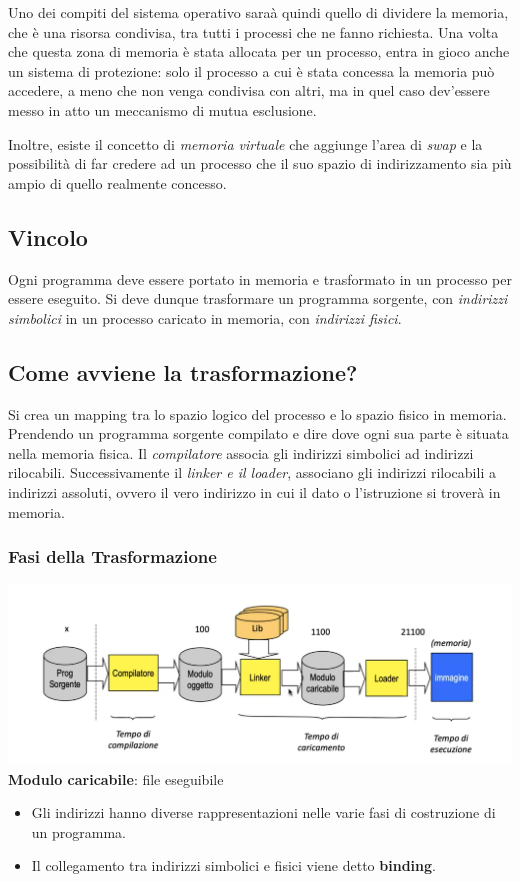 \documentclass[a4paper,12pt, twoside]{report}
\begin{document}
Uno dei compiti del sistema operativo sara\`a quindi quello di dividere la memoria, che \`e una risorsa condivisa, tra tutti i processi che ne fanno richiesta. Una volta che questa zona di memoria \`e stata allocata per un processo, entra in gioco anche un sistema di protezione: solo il processo a cui \`e stata concessa la memoria pu\`o accedere, a meno che non venga condivisa con altri, ma in quel caso dev'essere messo in atto un meccanismo di mutua esclusione.

Inoltre, esiste il concetto di \emph{memoria virtuale} che aggiunge l'area di \emph{swap} e la possibilit\`a di far credere ad un processo che il suo spazio di indirizzamento sia pi\`u ampio di quello realmente concesso.

\subsection{Vincolo}
Ogni programma deve essere portato in memoria e trasformato in un processo per essere eseguito.
Si deve dunque trasformare un programma sorgente, con \emph{indirizzi simbolici} in un processo caricato in memoria, con \emph{indirizzi fisici}. 

\subsection{Come avviene la trasformazione?}

Si crea un mapping tra lo spazio logico del processo e lo spazio fisico in memoria. Prendendo un programma sorgente compilato e dire dove ogni sua parte \`e situata nella memoria fisica. Il \emph{compilatore} associa gli indirizzi simbolici ad indirizzi rilocabili. Successivamente il \emph{linker e il loader}, associano gli indirizzi rilocabili a indirizzi assoluti, ovvero il vero indirizzo in cui il dato o l'istruzione si trover\`a in memoria.

\subsubsection{Fasi della Trasformazione}
\begin{center}
\includegraphics[scale=0.2]{trasf}
\tiny{\textbf{Modulo caricabile}: file eseguibile}
\end{center}
\begin{itemize}
\item Gli indirizzi hanno diverse rappresentazioni nelle varie fasi di costruzione di un programma.
\item Il collegamento tra indirizzi simbolici e fisici viene detto \textbf{binding}.
\end{itemize}
\end{document}
